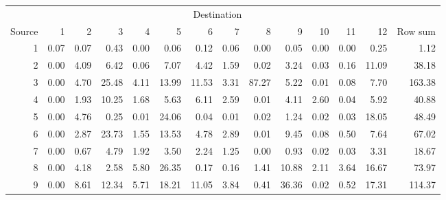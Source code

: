 \begin{sidewaystable}[htp]
  \centering
  \begin{tabular}[htp]{r|rrrrrrrrrrrr|r}
          & \multicolumn{12}{c|}{Destination} & \\
      Source &   1 &   2 &   3 &   4 &   5 &   6 &   7 &   8 &   9 & 10 &  11 &  12 & Row sum \\
    \hline
   1 &    0.07 &     0.07 &     0.43 &     0.00 &     0.06 &     0.12 &     0.06 &     0.00 &     0.05 &     0.00 &     0.00 &     0.25 &     1.12 \\
   2 &    0.00 &     4.09 &     6.42 &     0.06 &     7.07 &     4.42 &     1.59 &     0.02 &     3.24 &     0.03 &     0.16 &    11.09 &    38.18 \\
   3 &    0.00 &     4.70 &    25.48 &     4.11 &    13.99 &    11.53 &     3.31 &    87.27 &     5.22 &     0.01 &     0.08 &     7.70 &   163.38 \\
   4 &    0.00 &     1.93 &    10.25 &     1.68 &     5.63 &     6.11 &     2.59 &     0.01 &     4.11 &     2.60 &     0.04 &     5.92 &    40.88 \\
   5 &    0.00 &     4.76 &     0.25 &     0.01 &    24.06 &     0.04 &     0.01 &     0.02 &     1.24 &     0.02 &     0.03 &    18.05 &    48.49 \\
   6 &    0.00 &     2.87 &    23.73 &     1.55 &    13.53 &     4.78 &     2.89 &     0.01 &     9.45 &     0.08 &     0.50 &     7.64 &    67.02 \\
   7 &    0.00 &     0.67 &     4.79 &     1.92 &     3.50 &     2.24 &     1.25 &     0.00 &     0.93 &     0.02 &     0.03 &     3.31 &    18.67 \\
   8 &    0.00 &     4.18 &     2.58 &     5.80 &    26.35 &     0.17 &     0.16 &     1.41 &    10.88 &     2.11 &     3.64 &    16.67 &    73.97 \\
   9 &    0.00 &     8.61 &    12.34 &     5.71 &    18.21 &    11.05 &     3.84 &     0.41 &    36.36 &     0.02 &     0.52 &    17.31 &   114.37 \\

\end{tabular}
\end{sidewaystable}
